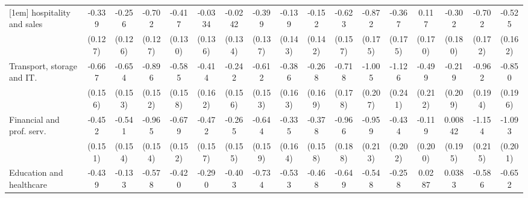 {\begin{tabular}{l*{16}{c}}
[1em]
hospitality and sales&      -0.339\sym{**} &      -0.256\sym{*}  &      -0.702\sym{***}&      -0.417\sym{**} &     -0.0334         &     -0.0242         &      -0.399\sym{**} &      -0.139         &      -0.152         &      -0.623\sym{***}&      -0.872\sym{***}&      -0.367\sym{*}  &       0.117         &      -0.302         &      -0.702\sym{***}&      -0.525\sym{**} \\
                    &     (0.127)         &     (0.126)         &     (0.127)         &     (0.130)         &     (0.136)         &     (0.134)         &     (0.137)         &     (0.143)         &     (0.142)         &     (0.157)         &     (0.175)         &     (0.175)         &     (0.170)         &     (0.180)         &     (0.172)         &     (0.162)         \\
[1em]
Transport, storage and IT.&      -0.667\sym{***}&      -0.654\sym{***}&      -0.896\sym{***}&      -0.585\sym{***}&      -0.414\sym{*}  &      -0.242         &      -0.612\sym{***}&      -0.386\sym{*}  &      -0.268         &      -0.718\sym{***}&      -1.005\sym{***}&      -1.126\sym{***}&      -0.499\sym{*}  &      -0.219         &      -0.962\sym{***}&      -0.850\sym{***}\\
                    &     (0.156)         &     (0.153)         &     (0.152)         &     (0.158)         &     (0.162)         &     (0.156)         &     (0.153)         &     (0.163)         &     (0.169)         &     (0.178)         &     (0.207)         &     (0.241)         &     (0.212)         &     (0.209)         &     (0.194)         &     (0.196)         \\
[1em]
Financial and prof. serv.&      -0.452\sym{**} &      -0.541\sym{***}&      -0.965\sym{***}&      -0.679\sym{***}&      -0.472\sym{**} &      -0.265         &      -0.644\sym{***}&      -0.335\sym{*}  &      -0.378\sym{*}  &      -0.966\sym{***}&      -0.959\sym{***}&      -0.434\sym{*}  &      -0.119         &     0.00842         &      -1.154\sym{***}&      -1.093\sym{***}\\
                    &     (0.151)         &     (0.154)         &     (0.154)         &     (0.152)         &     (0.157)         &     (0.155)         &     (0.159)         &     (0.164)         &     (0.158)         &     (0.188)         &     (0.213)         &     (0.202)         &     (0.200)         &     (0.195)         &     (0.215)         &     (0.201)         \\
[1em]
Education and healthcare&      -0.439\sym{**} &      -0.133         &      -0.578\sym{***}&      -0.420\sym{**} &      -0.290         &      -0.403\sym{*}  &      -0.734\sym{***}&      -0.533\sym{**} &      -0.468\sym{**} &      -0.649\sym{***}&      -0.548\sym{**} &      -0.258         &      0.0287         &      0.0383         &      -0.586\sym{**} &      -0.652\sym{***}\\

\end{tabular}}
